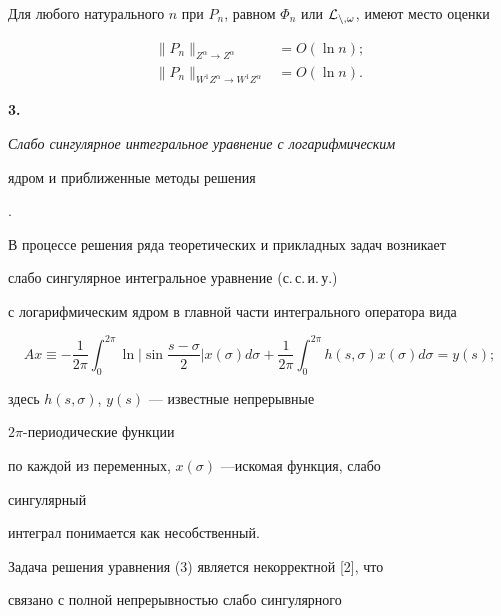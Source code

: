  


\begin{cornonum} 


Для любого натурального $n$ при $P_n$, равном $\Phi_n$ или $\cal 


L_{n,\omega}$, имеют место оценки 


\begin{align*} 


\|P_n\|_{Z^\alpha\to Z^\alpha}&=O(\ln n);\\ 


\|P_n\|_{W^1Z^\alpha\to W^1Z^\alpha}&=O(\ln n). 


\end{align*} 


\end{cornonum} 


 


 


{\bf 3.} {\it Слабо сингулярное интегральное уравнение с логарифмическим 


ядром и приближенные методы решения}. 


В процессе решения ряда теоретических и прикладных задач возникает 


слабо сингулярное интегральное уравнение (с.\,с.\,и.\,у.) 


с логарифмическим ядром в главной части интегрального оператора вида 


\begin{equation} 


Ax\equiv-\frac{1}{2\pi}\int^{2\pi}_0\ln\bigg|\sin 


\frac{s-\sigma}{2}\bigg|x(\sigma)d\sigma+\frac{1}{2\pi} 


\int^{2\pi}_0 h(s,\sigma)x(\sigma)d\sigma=y(s); 


\end{equation} 


здесь $h(s,\sigma)$, $y(s)$ --- известные непрерывные 


$2\pi$-периодические функции 


по каждой из переменных, $x(\sigma)$ ---искомая функция, слабо 


сингулярный 


интеграл понимается как несобственный. 


 


Задача решения уравнения (3) является некорректной [2], что 


связано с полной непрерывностью слабо сингулярного 


